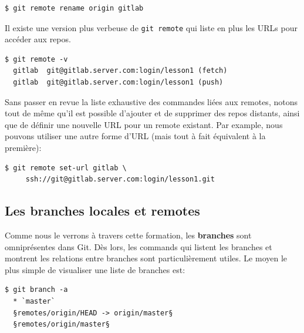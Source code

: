 \documentclass{../../common/tufte-latex/tufte-handout}
\begin{document}
\begin{lstlisting}[style=BashInputStyle]
  $ git remote rename origin gitlab
\end{lstlisting}

Il existe une version plus verbeuse de \texttt{git remote} qui liste en plus les URLs pour accéder aux repos.

\begin{lstlisting}[style=BashInputStyle]
  $ git remote -v
  gitlab  git@gitlab.server.com:login/lesson1 (fetch)
  gitlab  git@gitlab.server.com:login/lesson1 (push)
\end{lstlisting}

Sans passer en revue la liste exhaustive des commandes liées aux remotes, notons tout de même qu'il est possible d'ajouter et de supprimer des repos distants, ainsi que de définir une nouvelle URL pour un remote existant.
Par example, nous pouvons utiliser une autre forme d'URL (mais tout à fait équivalent à la première):


\begin{lstlisting}[style=BashInputStyle]
  $ git remote set-url gitlab \
     ssh://git@gitlab.server.com:login/lesson1.git
\end{lstlisting}

\subsection{Les branches locales et remotes}

Comme nous le verrons à travers cette formation, les \textbf{branches} sont omniprésentes dans Git.
Dès lors, les commands qui listent les branches et montrent les relations entre branches sont particulièrement utiles.
Le moyen le plus simple de visualiser une liste de branches est:


\begin{lstlisting}[style=BashInputStyle]
  $ git branch -a
  * `master`
  §remotes/origin/HEAD -> origin/master§
  §remotes/origin/master§
\end{lstlisting}
\end{document}
